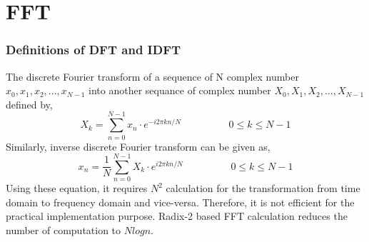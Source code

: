 %
%
\clearpage
\section{FFT}

\subsubsection{Definitions of DFT and IDFT}
The discrete Fourier transform of a sequence of N complex number $x_0, x_1, x_2,...,x_{N-1}$ into another sequance of complex number $X_0, X_1, X_2,...,X_{N-1}$ defined by,
\begin{equation}
X_k = \sum\limits_{n=0}^{N-1} x_n \cdot e^{-i2\pi kn/N}		\hspace{2cm}	0\leq k \leq N-1 
\end{equation}
Similarly, inverse discrete Fourier transform can be given as,
\begin{equation}
x_n = \frac{1}{N} \sum\limits_{n=0}^{N-1} X_k \cdot e^{i2\pi kn/N}		\hspace{2cm}	0\leq k \leq N-1 
\end{equation}
Using these equation, it requires $N^2$ calculation for the transformation from time domain to frequency domain and vice-versa. Therefore, it is not efficient for the practical implementation purpose. Radix-2 based FFT calculation reduces the number of computation to $Nlog n$.

